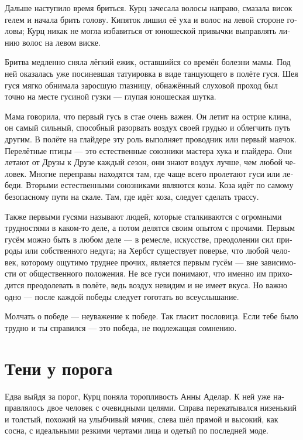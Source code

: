 \documentclass[a4paper,12pt,fleqn]{book}\usepackage{cooltooltips}\usepackage{polyglossia}\setdefaultlanguage[babelshorthands=true]{russian}\setotherlanguage{english}\defaultfontfeatures{Ligatures=TeX,Mapping=tex-text} \usepackage{xcolor}\definecolor{lightgray}{HTML}{bbbbbb}\color{lightgray}\newcommand{\ml}[3]{\textenglish{\textcolor{black}{#3}}}
\begin{document}
Дальше наступило время бриться.
Курц зачесала волосы направо, смазала висок гелем и начала брить голову.
Кипяток лишил её уха и волос на левой стороне головы;
Курц никак не могла избавиться от юношеской привычки выправлять линию волос на левом виске.

Бритва медленно сняла лёгкий ежик, оставшийся со времён болезни мамы.
Под ней оказалась уже посиневшая татуировка в виде танцующего в полёте гуся.
Шея гуся мягко обнимала заросшую глазницу, обнажённый слуховой проход был точно на месте гусиной гузки --- глупая юношеская шутка.

Мама говорила, что первый гусь в стае очень важен.
Он летит на острие клина, он самый сильный, способный разорвать воздух своей грудью и облегчить путь другим.
В полёте на глайдере эту роль выполняет проводник или первый маячок.
Перелётные птицы --- это естественные союзники мастера хука и глайдера.
Они летают от Друзы к Друзе каждый сезон, они знают воздух лучше, чем любой человек.
Многие переправы находятся там, где чаще всего пролетают гуси или лебеди.
Вторыми естественными союзниками являются козы.
Коза идёт по самому безопасному пути на скале.
Там, где идёт коза, следует сделать трассу.

Также первыми гусями называют людей, которые сталкиваются с огромными трудностями в каком-то деле, а потом делятся своим опытом с прочими.
Первым гусём можно быть в любом деле --- в ремесле, искусстве, преодолении сил природы или собственного недуга;
на Хербст существует поверье, что любой человек, которому ощутимо труднее прочих, является первым гусём --- вне зависимости от общественного положения.
Не все гуси понимают, что именно им приходится преодолевать в полёте, ведь воздух невидим и не имеет вкуса.
Но важно одно --- после каждой победы следует гоготать во всеуслышание.

Молчать о победе --- неуважение к победе.
Так гласит пословица.
Если тебе было трудно и ты справился --- это победа, не подлежащая сомнению.

\section{Тени у порога}

Едва выйдя за порог, Курц поняла торопливость Анны Аделар.
К ней уже направлялось двое человек с очевидными целями.
Справа перекатывался низенький и толстый, похожий на улыбчивый мячик, слева шёл прямой и высокий, как сосна, с идеальными резкими чертами лица и одетый по последней моде.
\end{document}
